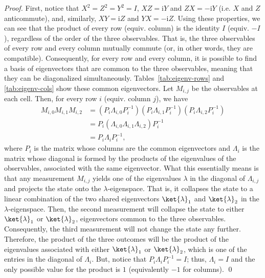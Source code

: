 \documentclass{llncs}
\newcommand{\ci}{\mathrm{i}}
\begin{document}
\begin{proof}
  \label{proof:product}
  First, notice that \(X^{2} = Z^{2} = Y^{2} = I\), \(XZ = \ci{}Y\)
  and \(ZX = -\ci{}Y\) (i.e. \(X\) and \(Z\) anticommute), and,
  similarly, \(XY = \ci{}Z\) and \(YX = -\ci{}Z\). Using these
  properties, we can see that the product of every row (equiv. column)
  is the identity \(I\) (equiv. \(-I\)), regardless of the order of
  the three observables.  That is, the three observables of every row
  and every column mutually commute (or, in other words, they are
  compatible).  Consequently, for every row and every column, it is
  possible to find a basis of eigenvectors that are common to the
  three observables, meaning that they can be diagonalized
  simultaneously. Tables~\ref{tab:eigenv-rows} and \ref{tab:eigenv-cols} show
  these common eigenvectors. Let \(M_{i, j}\) be the observables at
  each cell.  Then, for every row \(i\) (equiv. column \(j\)), we have
  \begin{align}
    M_{i, 0} M_{i, 1} M_{i, 2}
    &= (P_{i} \Lambda_{i, 0} P_{i}^{-1}) (P_{i}\Lambda_{i, 1}P_{i}^{-1}) (P_{i}\Lambda_{i, 2}P_{i}^{-1})
      \nonumber \\
    &= P_{i}(\Lambda_{i, 0} \Lambda_{i, 1} \Lambda_{i, 2})P_{i}^{-1} \nonumber \\
    &= P_{i}\Lambda_{i}P_{i}^{-1},
  \end{align}
  where \(P_{i}\) is the matrix whose columns are the common
  eigenvectors and \(\Lambda_{i}\) is the matrix whose diagonal is
  formed by the products of the eigenvalues of the observables,
  associated with the same eigenvector. What this essentially means is
  that any measurement \(M_{i, j}\) yields one of the eigenvalues
  \(\lambda\) in the diagonal of \(\Lambda_{i, j}\) and projects the
  state onto the \(\lambda\)-eigenspace. That is, it collapses the
  state to a linear combination of the two shared eigenvectors
  \(\ket{\lambda}_{1}\) and \(\ket{\lambda}_{2}\) in the
  \(\lambda\)-eigenspace. Then, the second measurement will collapse
  the state to either \(\ket{\lambda}_{1}\) or \(\ket{\lambda}_{2}\),
  eigenvectors common to the three observables.  Consequently, the
  third measurement will not change the state any further. Therefore,
  the product of the three outcomes will be the product of the
  eigenvalues associated with either \(\ket{\lambda}_{1}\) or
  \(\ket{\lambda}_{2}\), which is one of the entries in the diagonal
  of \(\Lambda_{i}\). But, notice that
  \(P_{i}\Lambda_{i}P_{i}^{-1} = I\); thus, \(\Lambda_{i} = I\) and
  the only possible value for the product is \(1\) (equivalently
  \(-1\) for columns). \qed
\end{proof}
\end{document}

